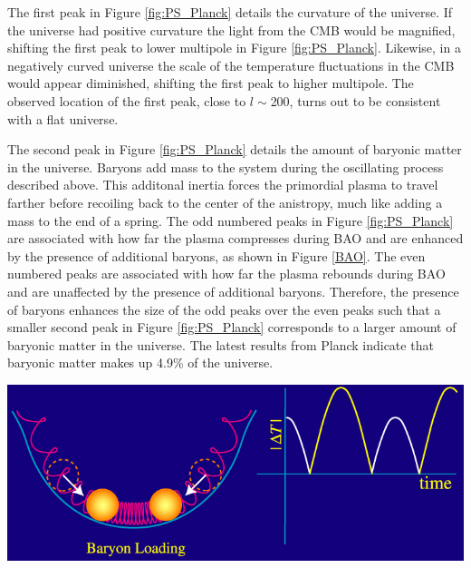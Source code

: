 \documentclass[a4paper,12pt]{article}
\begin{document}
The first peak in Figure \ref{fig:PS_Planck} details the curvature of the universe. If the universe had positive curvature the light from the CMB would be magnified, shifting the first peak to lower multipole in Figure \ref{fig:PS_Planck}.  Likewise, in a negatively curved universe the scale of the temperature fluctuations in the CMB would appear diminished, shifting the first peak to higher multipole.  The observed location of the first peak, close to $l\sim$200, turns out to be consistent with a flat universe.  

The second peak in Figure \ref{fig:PS_Planck} details the amount of baryonic matter in the universe.  Baryons add mass to the system during the oscillating process described above.  This additonal inertia forces the primordial plasma to travel farther before recoiling back to the center of the anistropy, much like adding a mass to the end of a spring.  The odd numbered peaks in Figure \ref{fig:PS_Planck} are associated with how far the plasma compresses during BAO and are enhanced by the presence of additional baryons, as shown in Figure \ref{BAO}.  The even numbered peaks are associated with how far the plasma rebounds during BAO and are unaffected by the presence of additional baryons.  Therefore, the presence of baryons enhances the size of the odd peaks over the even peaks such that a smaller second peak in Figure \ref{fig:PS_Planck} corresponds to a larger amount of baryonic matter in the universe.  The latest results from Planck indicate that baryonic matter makes up 4.9\% of the universe.


\begin{center} 
\includegraphics[scale=0.7]{BAO.png}
\label{BAO}
\end{center} 
\end{document}
